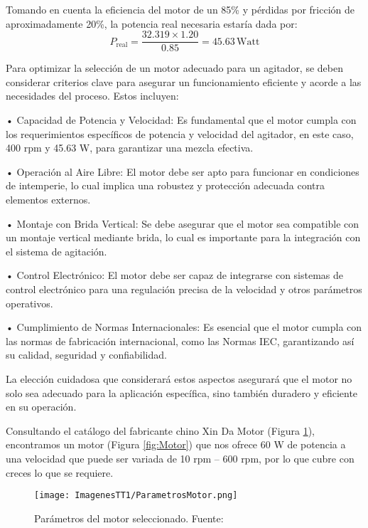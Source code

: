 \documentclass[14pt,oneside]{extarticle} %
\begin{document}
Tomando en cuenta la eficiencia del motor de un 85\% y pérdidas por fricción de aproximadamente 20\%, la potencia real necesaria estaría dada por:
\begin{equation*}
P_{\text{real}} = \frac{32.319 \times 1.20}{0.85} = 45.63\, \text{Watt}
\end{equation*}

Para optimizar la selección de un motor adecuado para un agitador, se deben considerar criterios clave para asegurar un funcionamiento eficiente y acorde a las necesidades del proceso. Estos incluyen:

•	Capacidad de Potencia y Velocidad: Es fundamental que el motor cumpla con los requerimientos específicos de potencia y velocidad del agitador, en este caso, 400 rpm y 45.63 W, para garantizar una mezcla efectiva.

•	Operación al Aire Libre: El motor debe ser apto para funcionar en condiciones de intemperie, lo cual implica una robustez y protección adecuada contra elementos externos.

•	Montaje con Brida Vertical: Se debe asegurar que el motor sea compatible con un montaje vertical mediante brida, lo cual es importante para la integración con el sistema de agitación.

•	Control Electrónico: El motor debe ser capaz de integrarse con sistemas de control electrónico para una regulación precisa de la velocidad y otros parámetros operativos.

•	Cumplimiento de Normas Internacionales: Es esencial que el motor cumpla con las normas de fabricación internacional, como las Normas IEC, garantizando así su calidad, seguridad y confiabilidad.

La elección cuidadosa que considerará estos aspectos asegurará que el motor no solo sea adecuado para la aplicación específica, sino también duradero y eficiente en su operación.

Consultando el catálogo del fabricante chino Xin Da Motor (Figura \ref{fig:Motorselec}), encontramos un motor (Figura \ref{fig:Motor}) que nos ofrece 60 W de potencia a una velocidad que puede ser variada de 10 rpm – 600 rpm, por lo que cubre con creces lo que se requiere.

\begin{figure}[H]
    \centering
    \texttt{[image: ImagenesTT1/ParametrosMotor.png]}
    \caption{Parámetros del motor seleccionado. Fuente:\cite{SeleccionMotor}}
    \label{fig:Motorselec}
\end{figure}
\end{document}
